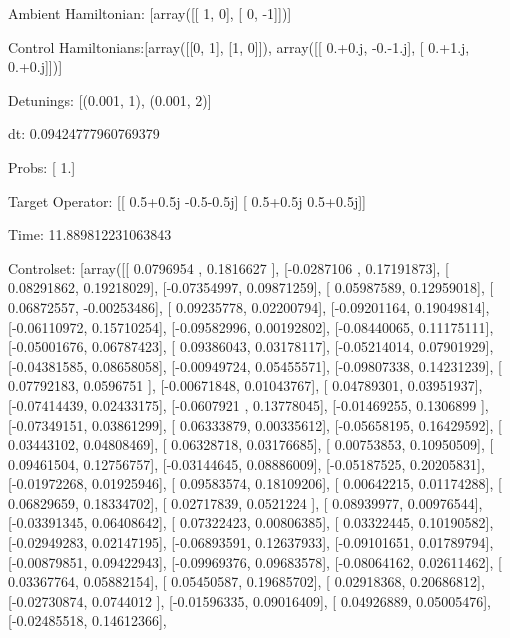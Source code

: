 \documentclass{article}
\begin{document}
    

\newpage

Ambient Hamiltonian: [array([[ 1,  0],
       [ 0, -1]])]

Control Hamiltonians:[array([[0, 1],
       [1, 0]]), array([[ 0.+0.j, -0.-1.j],
       [ 0.+1.j,  0.+0.j]])]

Detunings: [(0.001, 1), (0.001, 2)]

 dt: 0.09424777960769379

Probs: [ 1.]

Target Operator: [[ 0.5+0.5j -0.5-0.5j]
 [ 0.5+0.5j  0.5+0.5j]]

Time: 11.889812231063843

Controlset: [array([[ 0.0796954 ,  0.1816627 ],
       [-0.0287106 ,  0.17191873],
       [ 0.08291862,  0.19218029],
       [-0.07354997,  0.09871259],
       [ 0.05987589,  0.12959018],
       [ 0.06872557, -0.00253486],
       [ 0.09235778,  0.02200794],
       [-0.09201164,  0.19049814],
       [-0.06110972,  0.15710254],
       [-0.09582996,  0.00192802],
       [-0.08440065,  0.11175111],
       [-0.05001676,  0.06787423],
       [ 0.09386043,  0.03178117],
       [-0.05214014,  0.07901929],
       [-0.04381585,  0.08658058],
       [-0.00949724,  0.05455571],
       [-0.09807338,  0.14231239],
       [ 0.07792183,  0.0596751 ],
       [-0.00671848,  0.01043767],
       [ 0.04789301,  0.03951937],
       [-0.07414439,  0.02433175],
       [-0.0607921 ,  0.13778045],
       [-0.01469255,  0.1306899 ],
       [-0.07349151,  0.03861299],
       [ 0.06333879,  0.00335612],
       [-0.05658195,  0.16429592],
       [ 0.03443102,  0.04808469],
       [ 0.06328718,  0.03176685],
       [ 0.00753853,  0.10950509],
       [ 0.09461504,  0.12756757],
       [-0.03144645,  0.08886009],
       [-0.05187525,  0.20205831],
       [-0.01972268,  0.01925946],
       [ 0.09583574,  0.18109206],
       [ 0.00642215,  0.01174288],
       [ 0.06829659,  0.18334702],
       [ 0.02717839,  0.0521224 ],
       [ 0.08939977,  0.00976544],
       [-0.03391345,  0.06408642],
       [ 0.07322423,  0.00806385],
       [ 0.03322445,  0.10190582],
       [-0.02949283,  0.02147195],
       [-0.06893591,  0.12637933],
       [-0.09101651,  0.01789794],
       [-0.00879851,  0.09422943],
       [-0.09969376,  0.09683578],
       [-0.08064162,  0.02611462],
       [ 0.03367764,  0.05882154],
       [ 0.05450587,  0.19685702],
       [ 0.02918368,  0.20686812],
       [-0.02730874,  0.0744012 ],
       [-0.01596335,  0.09016409],
       [ 0.04926889,  0.05005476],
       [-0.02485518,  0.14612366],
\end{document}
